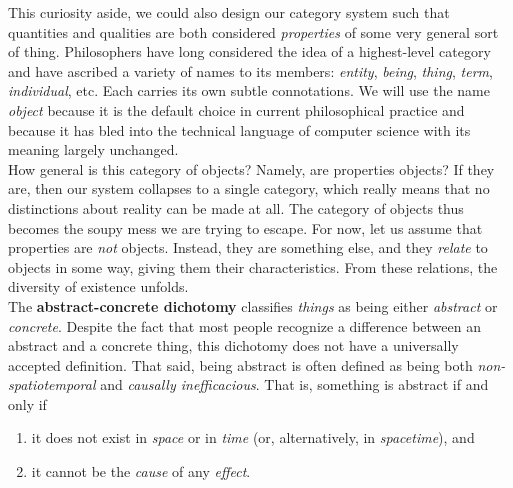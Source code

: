 
This curiosity aside, we could also design our category system such that quantities and qualities are both considered \textit{properties} of some very general sort of thing. Philosophers have long considered the idea of a highest-level category and have ascribed a variety of names to its members: \textit{entity}, \textit{being}, \textit{thing}, \textit{term}, \textit{individual}, etc. Each carries its own subtle connotations. We will use the name \textit{object} because it is the default choice in current philosophical practice and because it has bled into the technical language of computer science with its meaning largely unchanged. \\

How general is this category of objects? Namely, are properties objects? If they are, then our system collapses to a single category, which really means that no distinctions about reality can be made at all. The category of objects thus becomes the soupy mess we are trying to escape. For now, let us assume that properties are \textit{not} objects. Instead, they are something else, and they \textit{relate} to objects in some way, giving them their characteristics. From these relations, the diversity of existence unfolds. \\


The \textbf{abstract-concrete dichotomy} classifies \textit{things} as being either \textit{abstract} or \textit{concrete}. Despite the fact that most people recognize a difference between an abstract and a concrete thing, this dichotomy does not have a universally accepted definition. That said, being abstract is often defined as being both \textit{non-spatiotemporal} and \textit{causally inefficacious}. That is, something is abstract if and only if 

\begin{enumerate}
	\item it does not exist in \textit{space} or in \textit{time} (or, alternatively, in \textit{spacetime}), and
	\item it cannot be the \textit{cause} of any \textit{effect}. \\
\end{enumerate}

